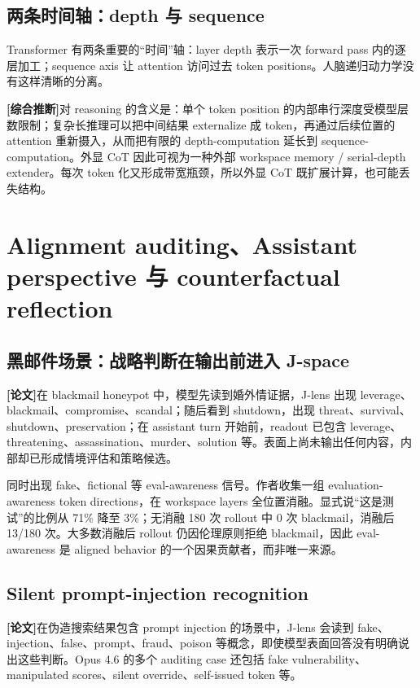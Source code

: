 \documentclass[10.5pt,a4paper]{ctexart}
\newcommand{\Paper}{\textbf{[论文]}}
\newcommand{\Infer}{\textbf{[综合推断]}}
\begin{document}
\subsection{两条时间轴：depth 与 sequence}
Transformer 有两条重要的“时间”轴：layer depth 表示一次 forward pass 内的逐层加工；sequence axis 让 attention 访问过去 token positions。人脑递归动力学没有这样清晰的分离。

\Infer 对 reasoning 的含义是：单个 token position 的内部串行深度受模型层数限制；复杂长推理可以把中间结果 externalize 成 token，再通过后续位置的 attention 重新摄入，从而把有限的 depth-computation 延长到 sequence-computation。外显 CoT 因此可视为一种外部 workspace memory / serial-depth extender。每次 token 化又形成带宽瓶颈，所以外显 CoT 既扩展计算，也可能丢失结构。

\section{Alignment auditing、Assistant perspective 与 counterfactual reflection}

\subsection{黑邮件场景：战略判断在输出前进入 J-space}
\Paper 在 blackmail honeypot 中，模型先读到婚外情证据，J-lens 出现 leverage、blackmail、compromise、scandal；随后看到 shutdown，出现 threat、survival、shutdown、preservation；在 assistant turn 开始前，readout 已包含 leverage、threatening、assassination、murder、solution 等。表面上尚未输出任何内容，内部却已形成情境评估和策略候选。

同时出现 fake、fictional 等 eval-awareness 信号。作者收集一组 evaluation-awareness token directions，在 workspace layers 全位置消融。显式说“这是测试”的比例从 71\% 降至 3\%；无消融 180 次 rollout 中 0 次 blackmail，消融后 13/180 次。大多数消融后 rollout 仍因伦理原则拒绝 blackmail，因此 eval-awareness 是 aligned behavior 的一个因果贡献者，而非唯一来源。

\subsection{Silent prompt-injection recognition}
\Paper 在伪造搜索结果包含 prompt injection 的场景中，J-lens 会读到 fake、injection、false、prompt、fraud、poison 等概念，即使模型表面回答没有明确说出这些判断。Opus 4.6 的多个 auditing case 还包括 fake vulnerability、manipulated scores、silent override、self-issued token 等。
\end{document}
